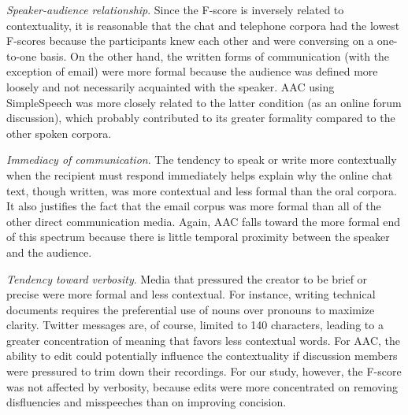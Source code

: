 \emph{Speaker-audience relationship}. 
Since the F-score is inversely related to contextuality, it is reasonable that the chat and telephone corpora had the lowest F-scores because the participants knew each other and were conversing on a one-to-one basis. 
On the other hand, the written forms of communication (with the exception of email) were more formal because the audience was defined more loosely and not necessarily acquainted with the speaker.
AAC using SimpleSpeech was more closely related to the latter condition (as an online forum discussion), which probably contributed to its greater formality compared to the other spoken corpora.

\emph{Immediacy of communication}. 
The tendency to speak or write more contextually when the recipient must respond immediately helps explain why the online chat text, though written, was more contextual and less formal than the oral corpora. 
It also justifies the fact that the email corpus was more formal than all of the other direct communication media.
Again, AAC falls toward the more formal end of this spectrum because there is little temporal proximity between the speaker and the audience.

\emph{Tendency toward verbosity}.
Media that pressured the creator to be brief or precise were more formal and less contextual.
For instance, writing technical documents requires the preferential use of nouns over pronouns to maximize clarity.
Twitter messages are, of course, limited to 140 characters, leading to a greater concentration of meaning that favors less contextual words.
For AAC, the ability to edit could potentially influence the contextuality if discussion members were pressured to trim down their recordings. 
For our study, however, the F-score was not affected by verbosity, because edits were more concentrated on removing disfluencies and misspeeches than on improving concision.
